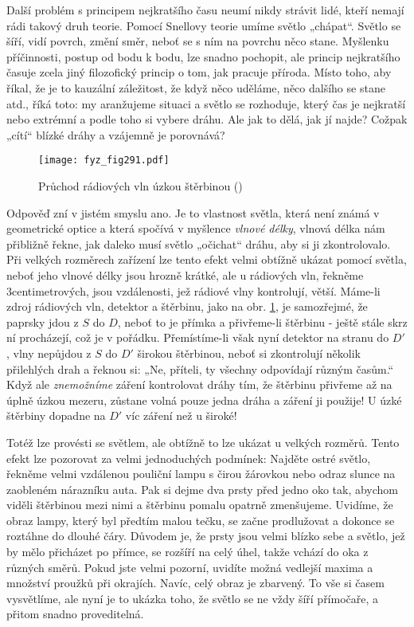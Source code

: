     Další problém s principem nejkratšího času neumí nikdy strávit lidé, kteří nemají rádi takový 
    druh teorie. Pomocí Snellovy teorie umíme světlo „chápat“. Světlo se šíří, vidí povrch, změní 
    směr, neboť se s ním na povrchu něco stane. Myšlenku příčinnosti, postup od bodu k bodu, lze 
    snadno pochopit, ale princip nejkratšího časuje zcela jiný filozofický princip o tom, jak 
    pracuje příroda. Místo toho, aby říkal, že je to kauzální záležitost, že když něco uděláme, 
    něco dalšího se stane atd., říká toto: my aranžujeme situaci a světlo se rozhoduje, který čas 
    je nejkratší nebo extrémní a podle toho si vybere dráhu. Ale jak to dělá, jak jí najde? Cožpak 
    „cítí“ blízké dráhy a vzájemně je porovnává?
    
    \begin{figure}[ht!] %
      \centering
      \texttt{[image: fyz\_fig291.pdf]}
      \caption{Průchod rádiových vln úzkou štěrbinou
               (\cite[s.~354]{Feynman01})}
      \label{fyz:fig291}
    \end{figure}
    
    Odpověď zní v jistém smyslu ano. Je to vlastnost světla, která není známá v geometrické optice 
    a která spočívá v myšlence \emph{vlnové délky}, vlnová délka nám přibližně řekne, jak daleko 
    musí světlo „očichat“ dráhu, aby si ji zkontrolovalo. Při velkých rozměrech zařízení lze tento 
    efekt velmi obtížně ukázat pomocí světla, neboť jeho vlnové délky jsou hrozně krátké, ale u 
    rádiových vln, řekněme 3centimetrových, jsou vzdálenosti, jež rádiové vlny kontrolují, větší. 
    Máme-li zdroj rádiových vln, detektor a štěrbinu, jako na obr. \ref{fyz:fig291}, je samozřejmé, 
    že paprsky jdou z \(S\) do \(D\), neboť to je přímka a přivřeme-li štěrbinu - ještě stále skrz 
    ní procházejí, což je v pořádku. Přemístíme-li však nyní detektor na stranu do \(D'\), vlny 
    nepůjdou z \(S\) do \(D'\) širokou štěrbinou, neboť si zkontrolují několik přilehlých drah a 
    řeknou si: „Ne, příteli, ty všechny odpovídají různým časům.“ Když ale \emph{znemožníme} záření 
    kontrolovat dráhy tím, že štěrbinu přivřeme až na úplně úzkou mezeru, zůstane volná pouze jedna 
    dráha a záření ji použije! U úzké štěrbiny dopadne na \(D'\) víc záření než u široké!
    
    Totéž lze provésti se světlem, ale obtížně to lze ukázat u velkých rozměrů. Tento efekt lze 
    pozorovat za velmi jednoduchých podmínek: Najděte ostré světlo, řekněme velmi vzdálenou 
    pouliční lampu s čirou žárovkou nebo odraz slunce na zaobleném nárazníku auta. Pak si dejme dva 
    prsty před jedno oko tak, abychom viděli štěrbinou mezi nimi a štěrbinu pomalu opatrně 
    zmenšujeme. Uvidíme, že obraz lampy, který byl předtím malou tečku, se začne prodlužovat a 
    dokonce se roztáhne do dlouhé čáry. Důvodem je, že prsty jsou velmi blízko sebe a světlo, jež 
    by mělo přicházet po přímce, se rozšíří na celý úhel, takže vchází do oka z různých směrů. 
    Pokud jste velmi pozorní, uvidíte možná vedlejší maxima a množství proužků při okrajích. Navíc, 
    celý obraz je zbarvený. To vše si časem vysvětlíme, ale nyní je to ukázka toho, že světlo se ne 
    vždy šíří přímočaře, a přitom snadno proveditelná.
    
